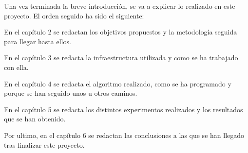 \hspace{1 cm} Una vez terminada la breve introducci\'on, se va a explicar lo realizado en este proyecto. El orden seguido ha sido el siguiente:

\hspace{1 cm} En el cap\'itulo 2 se redactan los objetivos propuestos y la metodolog\'ia seguida para llegar hasta ellos. 

\hspace{1 cm} En el cap\'itulo 3 se redacta la infraestructura utilizada y como se ha trabajado con ella. 

\hspace{1 cm} En el cap\'itulo 4 se redacta el algoritmo realizado, como se ha programado y porque se han seguido unos u otros caminos.

\hspace{1 cm} En el cap\'itulo 5 se redacta los distintos experimentos realizados y los resultados que se han obtenido.

\hspace{1 cm} Por ultimo, en el cap\'itulo 6 se redactan las conclusiones a las que se han llegado tras finalizar este proyecto.

